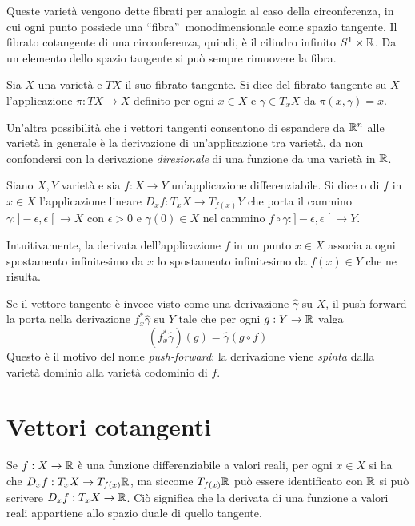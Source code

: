 Queste varietà vengono dette fibrati per analogia al caso della circonferenza, in cui ogni punto possiede una \textquotedblleft fibra\textquotedblright\ monodimensionale come spazio tangente. Il fibrato cotangente di una circonferenza, quindi, è il cilindro infinito $S^1 \times \mathbb{R}$. Da un elemento dello spazio tangente si può sempre rimuovere la fibra.
\begin{definition}
  Sia $X$ una varietà e $T X$ il suo fibrato tangente. Si dice  del fibrato tangente su $X$ l'applicazione $\pi: TX \to X$ definito per ogni $x \in X$ e $\gamma \in T_x X$ da $\pi(x,\gamma) = x$.
\end{definition}

Un'altra possibilità che i vettori tangenti consentono di espandere da $\mathbb{R}^{n}$ alle varietà in generale è la derivazione di un'applicazione tra varietà, da non confondersi con la derivazione \emph{direzionale} di una funzione da una varietà in $\mathbb{R}$.
\begin{definition}
  Siano $X,Y$ varietà e sia $f:X\to Y$ un'applicazione differenziabile. Si dice  o  di $f$ in $x \in X$ l'applicazione lineare $D_x f:T_x X \to T_{f(x)}Y$ che porta il cammino $\gamma: ]-\epsilon, \epsilon\;[\ \to X$ con $\epsilon>0$ e $\gamma(0) \in X$ nel cammino $f \circ \gamma:]-\epsilon, \epsilon\;[\ \to Y$.
\end{definition}
\begin{remark}
  Intuitivamente, la derivata dell'applicazione $f$ in un punto $x \in X$ associa a ogni spostamento infinitesimo da $x$ lo spostamento infinitesimo da $f(x) \in Y$ che ne risulta.
\end{remark}
\begin{remark}
  Se il vettore tangente è invece visto come una derivazione $\hat{\gamma}$ su $X$, il push-forward la porta nella derivazione $f^*_x \hat{\gamma}$ su $Y$ tale che per ogni $g:Y\to \mathbb{R}$ valga
  \begin{equation*}
    (f^*_x \hat{\gamma})(g) = \hat{\gamma} (g \circ f) 
  \end{equation*} 
  Questo è il motivo del nome \emph{push-forward}: la derivazione viene \emph{spinta} dalla varietà dominio alla varietà codominio di $f$. 
\end{remark}

\section{Vettori cotangenti}
Se $f:X \to \mathbb{R}$ è una funzione differenziabile a valori reali, per ogni $x \in X$ si ha che $D_x f: T_x X \to T_{f(x)}\mathbb{R}$, ma siccome $T_{f(x)}\mathbb{R}$ può essere identificato con $\mathbb{R}$ si può scrivere $D_x f: T_x X \to \mathbb{R}$. Ciò significa che la derivata di una funzione a valori reali appartiene allo spazio duale di quello tangente.

